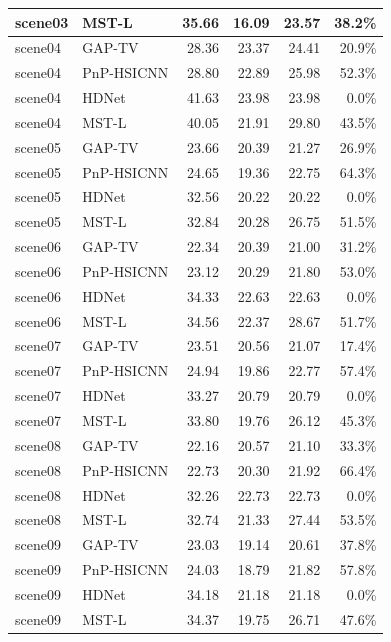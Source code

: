 \documentclass[11pt]{article}
\theoremstyle{definition}
\begin{document}
\begin{footnotesize}
\begin{longtable}{l l r r r r}
scene03 & MST-L         & 35.66 & 16.09 & 23.57 & 38.2\% \\
\midrule
scene04 & GAP-TV        & 28.36 & 23.37 & 24.41 & 20.9\% \\
scene04 & PnP-HSICNN    & 28.80 & 22.89 & 25.98 & 52.3\% \\
scene04 & HDNet         & 41.63 & 23.98 & 23.98 & 0.0\% \\
scene04 & MST-L         & 40.05 & 21.91 & 29.80 & 43.5\% \\
\midrule
scene05 & GAP-TV        & 23.66 & 20.39 & 21.27 & 26.9\% \\
scene05 & PnP-HSICNN    & 24.65 & 19.36 & 22.75 & 64.3\% \\
scene05 & HDNet         & 32.56 & 20.22 & 20.22 & 0.0\% \\
scene05 & MST-L         & 32.84 & 20.28 & 26.75 & 51.5\% \\
\midrule
scene06 & GAP-TV        & 22.34 & 20.39 & 21.00 & 31.2\% \\
scene06 & PnP-HSICNN    & 23.12 & 20.29 & 21.80 & 53.0\% \\
scene06 & HDNet         & 34.33 & 22.63 & 22.63 & 0.0\% \\
scene06 & MST-L         & 34.56 & 22.37 & 28.67 & 51.7\% \\
\midrule
scene07 & GAP-TV        & 23.51 & 20.56 & 21.07 & 17.4\% \\
scene07 & PnP-HSICNN    & 24.94 & 19.86 & 22.77 & 57.4\% \\
scene07 & HDNet         & 33.27 & 20.79 & 20.79 & 0.0\% \\
scene07 & MST-L         & 33.80 & 19.76 & 26.12 & 45.3\% \\
\midrule
scene08 & GAP-TV        & 22.16 & 20.57 & 21.10 & 33.3\% \\
scene08 & PnP-HSICNN    & 22.73 & 20.30 & 21.92 & 66.4\% \\
scene08 & HDNet         & 32.26 & 22.73 & 22.73 & 0.0\% \\
scene08 & MST-L         & 32.74 & 21.33 & 27.44 & 53.5\% \\
\midrule
scene09 & GAP-TV        & 23.03 & 19.14 & 20.61 & 37.8\% \\
scene09 & PnP-HSICNN    & 24.03 & 18.79 & 21.82 & 57.8\% \\
scene09 & HDNet         & 34.18 & 21.18 & 21.18 & 0.0\% \\
scene09 & MST-L         & 34.37 & 19.75 & 26.71 & 47.6\% \\

\end{longtable}
\end{footnotesize}
\end{document}
